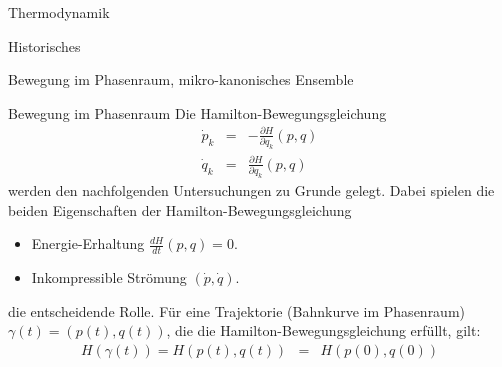\def\titlestr{Thermodynamik}
\ifx\makebook\undefined
	
\else
	\begin{chapter}{\titlestr}
\fi


\begin{section}{Historisches}
\end{section}

\begin{section}{Bewegung im Phasenraum, mikro-kanonisches Ensemble}
\begin{subsection}{Bewegung im Phasenraum}
Die Hamilton-Bewegungsgleichung
\begin{eqnarray*}
\dot{p}_k &=&-\frac{\partial H}{\partial q_k}(p,q)\\
\dot{q}_k &=& \frac{\partial H}{\partial q_k}(p,q)
\end{eqnarray*}
werden den nachfolgenden Untersuchungen zu Grunde gelegt. Dabei spielen die beiden Eigenschaften der Hamilton-Bewegungsgleichung
\begin{itemize}
	\item Energie-Erhaltung $\frac{d H}{dt}(p,q)=0$.
	\item Inkompressible Strömung $(\dot{p},\dot{q})$.
\end{itemize}
die entscheidende Rolle. Für eine Trajektorie (Bahnkurve im Phasenraum) $\gamma(t)=(p(t),q(t))$, die die Hamilton-Bewegungsgleichung
erfüllt, gilt:
\begin{eqnarray*}
H(\gamma(t)) = H(p(t),q(t)) &=& H(p(0),q(0))
\end{eqnarray*}


\end{subsection}
\end{section}
\end{chapter}
